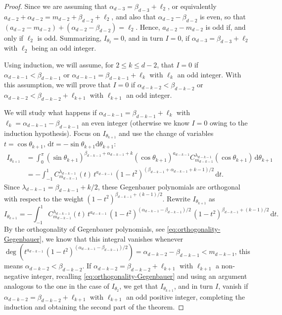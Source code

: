 \documentclass[a4paper]{article}
\theoremstyle{plain}
\theoremstyle{definition}
\newcommand{\dr}{\mathrm{d}}
\begin{document}
\begin{proof}
        
        Since we are assuming that $\alpha_{d-3}=\beta_{d-3}+\ell_2$, or equivalently $a_{d-2}+\alpha_{d-2}=m_{d-2}+\beta_{d-2}+\ell_2$, and also that $\alpha_{d-2}-\beta_{d-2}$ is even, so that $(a_{d-2}-m_{d-2})+(\alpha_{d-2}-\beta_{d-2})=\ell_2$. Hence, $a_{d-2}-m_{d-2}$ is odd if, and only if $\ell_2$ is odd. Summarizing, $I_{\theta_2}=0$, and in turn $I=0$, if $\alpha_{d-3}=\beta_{d-3}+\ell_2$ with $\ell_2$ being an odd integer.

        Using induction, we will assume, for $2\leq k\leq d-2$, that $I = 0$ if $\alpha_{d-k-1}<\beta_{d-k-1}$ or $\alpha_{d-k-1}=\beta_{d-k-1}+\ell_{k}$ with $\ell_k$ an odd integer. With this assumption, we will prove that $I=0$ if $\alpha_{d-k-2}<\beta_{d-k-2}$ or $\alpha_{d-k-2}<\beta_{d-k-2}+\ell_{k+1}$ with $\ell_{k+1}$ an odd integer.

        We will study what happens if $\alpha_{d-k-1}=\beta_{d-k-1}+\ell_{k}$ with $\ell_k=\alpha_{d-k-1}-\beta_{d-k-1}$ an even integer (otherwise we know $I=0$ owing to the induction hypothesis). Focus on $I_{\theta_{k+1}}$ and use the change of variables $t=\cos\theta_{k+1}$, $\dr t = -\sin\theta_{k+1}\dr \theta_{k+1}$:
        \begin{equation*}
            \begin{aligned}
                I_{\theta_{k+1}}&= \int_{0}^\pi (\sin\theta_{k+1})^{\beta_{d-k-1}+\alpha_{d-k-1}+k}(\cos\theta_{k+1})^{a_{d-k-1}}C_{m_{d-k-1}}^{\lambda_{d-k-1}}(\cos\theta_{k+1})\,\dr \theta_{k+1}\\
                &= -\int_{-1}^1 C_{m_{d-k-1}}^{\lambda_{d-k-1}}(t)\,t^{a_{d-k-1}}\,(1-t^2)^{(\beta_{d-k-1}+\alpha_{d-k-1}+k-1)/2}\,\dr t .
            \end{aligned}
        \end{equation*}
        Since $\lambda_{d-k-1}=\beta_{d-k-1}+ k/2$, these Gegenbauer polynomials are orthogonal with respect to the weight $(1-t^2)^{\beta_{d-k-1}+ (k-1)/2}$. Rewrite $I_{\theta_{k+1}}$ as
        $$
        I_{\theta_{k+1}} = -\int_{-1}^1 C_{m_{d-k-1}}^{\lambda_{d-k-1}}(t)\,t^{a_{d-k-1}}\,(1-t^2)^{(\alpha_{d-k-1}-\beta_{d-k-1})/2}\,(1-t^2)^{\beta_{d-k-1}+ (k-1)/2}\,\dr t.
        $$
        By the orthogonality of Gegenbauer polynomials, see \eqref{eq:orthogonality-Gegenbauer}, we know that this integral vanishes whenever $\deg(t^{a_{d-k-1}}\,(1-t^2)^{(\alpha_{d-k-1}-\beta_{d-k-1})/2})=\alpha_{d-k-2}-\beta_{d-k-1}<m_{d-k-1}$, this means $\alpha_{d-k-2}<\beta_{d-k-2}$. If $\alpha_{d-k-2}=\beta_{d-k-2}+\ell_{k+1}$ with $\ell_{k+1}$ a non-negative integer, recalling \eqref{eq:orthogonality-Gegenbauer} and using an argument analogous to the one in the case of $I_{\theta_2}$, we get that $I_{\theta_{k+1}}$, and in turn $I$, vanish if $\alpha_{d-k-2}=\beta_{d-k-2}+\ell_{k+1}$ with $\ell_{k+1}$ an odd positive integer, completing the induction and obtaining the second part of the theorem.
        

\end{proof}
\end{document}
